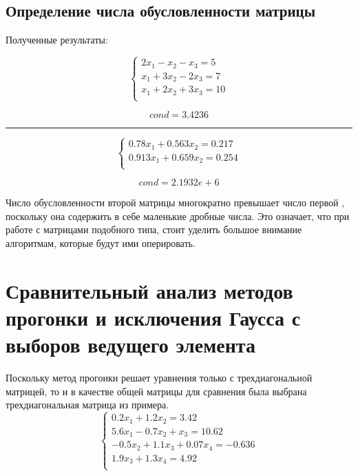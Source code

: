 \documentclass{article}
\begin{document}
\subsection{Определение числа обусловленности матрицы}
Полученные результаты:
\begin{multicols}{2}
\begin{displaymath}
  \left\{ \begin{array}{ll}
  2x_{1} - x_{2} - x_{3}= 5\\
  x_{1} + 3x_{2} - 2x_{3} = 7\\
  x_{1} + 2x_{2} + 3x_{3} = 10\\
\end{array} \right.
\end{displaymath}

\begin{displaymath}
  cond = 3.4236
\end{displaymath}
\end{multicols}
\rule[1mm]{10cm}{0.1mm}
\begin{multicols}{2}
\begin{displaymath}
  \left\{ \begin{array}{ll}
  0.78x_{1} + 0.563x_{2} = 0.217\\
  0.913x_{1} + 0.659x_{2} = 0.254\\
\end{array} \right.
\end{displaymath}

\begin{displaymath}
  cond = 2.1932e+6
\end{displaymath}
\end{multicols}
Число обусловленности второй матрицы многократно превышает число первой
, поскольку она содержить в себе маленькие дробные числа.
Это означает, что при работе с матрицами подобного типа, стоит уделить
большое внимание алгоритмам, которые будут ими оперировать.

 \section{Сравнительный анализ методов прогонки и исключения Гаусса с
выборов ведущего элемента}
Поскольку метод прогонки решает уравнения только с трехдиагональной матрицей,
то и в качестве общей матрицы для сравнения была выбрана трехдиагональная
матрица из примера.
\begin{displaymath}
  \left\{ \begin{array}{ll}
  0.2x_{1} + 1.2x_{2} = 3.42\\
  5.6x_{1} - 0.7x_{2} + x_{3} = 10.62\\
  -0.5x_{2} + 1.1x_{3} + 0.07x_{4} = -0.636\\
  1.9x_{3} + 1.3x_{4} = 4.92\\
\end{array} \right.
\end{displaymath}
\end{document}
